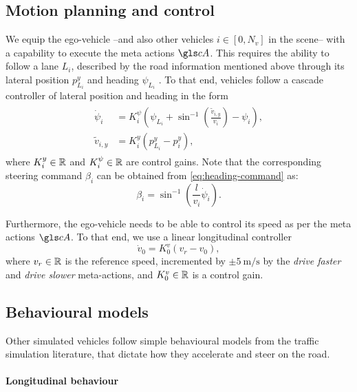 \subsection{Motion planning and control}

We equip the ego-vehicle --and also other vehicles $i\in[0, N_v]$ in the scene-- with a capability to execute the meta actions $\cA$. This requires the ability to follow a lane $L_i$, described by the road information mentioned above through its lateral position $p^y_{L_i}$ and heading $\psi_{L_i}$ . To that end, vehicles follow a cascade controller of lateral position and heading in the form
\begin{align}
\label{eq:heading-command}
\begin{split}
\dot{\psi}_i &= K_i^\psi\left(\psi_{L_i}+\sin^{-1}\left(\frac{\tilde{v}_{i,y}}{v_i}\right)-\psi_i\right),\\
\tilde{v}_{i,y} &= K_i^y (p^y_{L_i}-p^y_i),
\end{split}
\end{align}
where $K_i^y\in\mathbb{R}$ and $K_i^\psi\in\mathbb{R}$ are control gains.
Note that the corresponding steering command $\beta_i$ can be obtained from \eqref{eq:heading-command} as: $$\beta_i = \sin^{-1}\left(\frac{l}{v_i}\dot{\psi}_i\right).$$

Furthermore, the ego-vehicle needs to be able to control its speed as per the meta actions $\cA$. To that end, we use a linear longitudinal controller
\begin{equation*}
\dot{v}_0 = K_0^v(v_r - v_0),
\end{equation*}
where $v_r\in\mathbb{R}$ is the reference speed, incremented by $\pm \SI[per-mode=symbol]{5}{\meter\per\second}$ by the \emph{drive faster} and \emph{drive slower} meta-actions, and $K_0^v\in\mathbb{R}$ is a control gain.

\subsection{Behavioural models}

Other simulated vehicles follow simple behavioural models from the traffic simulation literature, that dictate how they accelerate and steer on the road.

\paragraph{Longitudinal behaviour}

